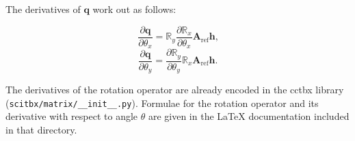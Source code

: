 \documentclass[12pt, letterpaper]{article}
\begin{document}
The derivatives of $\mathbf{q}$ work out as follows:

  \begin{equation}
   \dfrac{\partial \mathbf{q}} {\partial \theta_{x}} = 
  \mathbb{R}_y \dfrac{\partial\mathbb{R}_x}{\partial \theta_{x}}  \mathbf{A}_\mathrm{ref} \mathbf{h}
    \text{,}
    \label{eqn:qthx}
  \end{equation}
  \begin{equation}
   \dfrac{\partial \mathbf{q}} {\partial \theta_{y}} = 
  \dfrac{\partial\mathbb{R}_y}{\partial \theta_{y}} \mathbb{R}_x \mathbf{A}_\mathrm{ref} \mathbf{h}
    \text{.}
    \label{eqn:qthy}
  \end{equation}

The derivatives of the rotation operator are already encoded in the cctbx library ({\tt scitbx/matrix/\_\_init\_\_.py}).  Formulae for the rotation operator and its derivative with 
respect to angle $\theta$ are given in the LaTeX documentation included in that directory.
\end{document}
